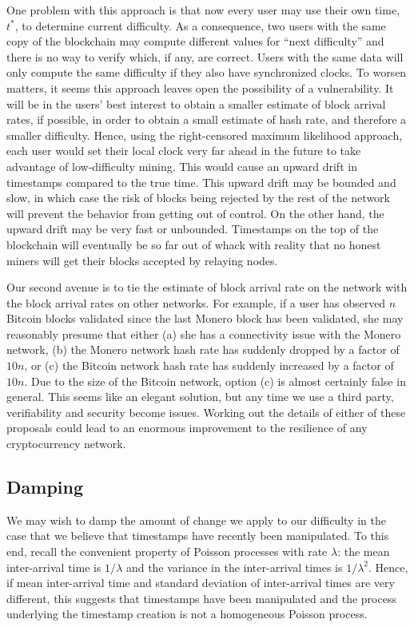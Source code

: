 \documentclass[12pt,english]{mrl}
\theoremstyle{definition}
\numberwithin{equation}{section}
\numberwithin{figure}{section}
\numberwithin{equation}{section}
\numberwithin{equation}{section}
\numberwithin{figure}{section}
\begin{document}
One problem with this approach is that now every user may use their own time, $t^*$, to determine current difficulty. As a consequence, two users with the same copy of the blockchain may compute different values for ``next difficulty'' and there is no way to verify which, if any, are correct. Users with the same data will only compute the same difficulty if they also have synchronized clocks. To worsen matters, it seems this approach leaves open the possibility of a vulnerability. It will be in the users' best interest to obtain a smaller estimate of block arrival rates, if possible, in order to obtain a small estimate of hash rate, and therefore a smaller difficulty. Hence, using the right-censored maximum likelihood approach, each user would set their local clock very far ahead in the future to take advantage of low-difficulty mining. This would cause an upward drift in timestamps compared to the true time. This upward drift may be bounded and slow, in which case the risk of blocks being rejected by the rest of the network will prevent the behavior from getting out of control. On the other hand, the upward drift may be very fast or unbounded. Timestamps on the top of the blockchain will eventually be so far out of whack with reality that no honest miners will get their blocks accepted by relaying nodes.

Our second avenue is to tie the estimate of block arrival rate on the network with the block arrival rates on other networks. For example, if a user has observed $n$ Bitcoin blocks validated since the last Monero block has been validated, she may reasonably presume that either (a) she has a connectivity issue with the Monero network, (b) the Monero network hash rate has suddenly dropped by a factor of $10n$, or (c) the Bitcoin network hash rate has suddenly increased by a factor of $10n$.  Due to the size of the Bitcoin network, option (c) is almost certainly false in general. This seems like an elegant solution, but any time we use a third party, verifiability and security become issues. Working out the details of either of these proposals could lead to an enormous improvement to the resilience of any cryptocurrency network.


\subsection{Damping}

We may wish to damp the amount of change we apply to our difficulty in the case that we believe that timestamps have recently been manipulated. To this end, recall the convenient property of Poisson processes with rate $\lambda$: the mean inter-arrival time is $1/\lambda$ and the variance in the inter-arrival times is $1/\lambda^2$. Hence, if mean inter-arrival time and standard deviation of inter-arrival times are very different, this suggests that timestamps have been manipulated and the process underlying the timestamp creation is not a homogeneous Poisson process. 
\end{document}
